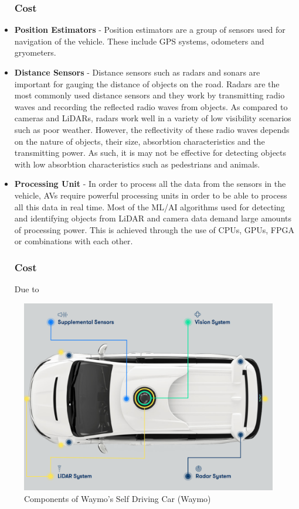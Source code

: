 \begin{itemize}
    \subsubsection{Cost}
    
    
    \item \textbf{Position Estimators} - Position estimators are a group of sensors used for navigation of the vehicle. These include GPS systems, odometers and gryometers. 
    \item \textbf{Distance Sensors} - Distance sensors such as radars and sonars are important for gauging the distance of objects on the road. 
    Radars are the most commonly used distance sensors and they work by transmitting radio waves and recording the reflected radio waves from objects. As compared to cameras and LiDARs, radars work well in a variety of low visibility scenarios such as poor weather. 
    However, the reflectivity of these radio waves depends on the nature of objects, their size, absorbtion characteristics and the transmitting power. As such, it is may not be effective for detecting objects with low absorbtion characteristics such as pedestrians and animals.
    
    \item \textbf{Processing Unit} - In order to process all the data from the sensors in the vehicle, AVs require powerful processing units in order to be able to process all this data in real time. Most of the ML/AI algorithms used for detecting and identifying objects from LiDAR and camera data demand large amounts of processing power. This is achieved through the use of CPUs, GPUs, FPGA or combinations with each other. 
    \subsubsection{Cost}
    Due to 
    
    
\end{itemize}


\begin{figure}[h]
    \centering
    \includegraphics[width=\textwidth]{media/waymo.png}
    \caption{Components of Waymo's Self Driving Car (Waymo)}
    \label{fig:my_label}
\end{figure}


